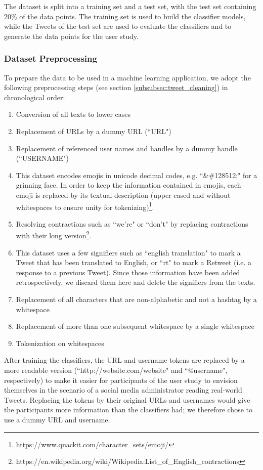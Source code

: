 The dataset is split into a training set and a test set, with the test set containing 20\% of the data points. The training set is used to build the classifier models, while the Tweets of the test set are used to evaluate the classifiers and to generate the data points for the user study.



\subsubsection{Dataset Preprocessing}
To prepare the data to be used in a machine learning application, we adopt the following preprocessing steps (see section \ref{subsubsec:tweet_cleaning}) in chronological order:
\begin{enumerate}
	\item Conversion of all texts to lower cases
	\item Replacement of URLs by a dummy URL (``URL")
	\item Replacement of referenced user names and handles by a dummy handle (``USERNAME")
	\item This dataset encodes emojis in unicode decimal codes, e.g. ``\&\#128512;" for a grinning face. In order to keep the information contained in emojis, each emoji is replaced by its textual description (upper cased and without whitespaces to ensure unity for tokenizing)\footnote{https://www.quackit.com/character\_sets/emoji/}.
	\item Resolving contractions such as ``we're" or ``don't" by replacing contractions with their long version\footnote{https://en.wikipedia.org/wiki/Wikipedia:List\_of\_English\_contractions}.
	\item This dataset uses a few signifiers such as ``english translation" to mark a Tweet that has been translated to English, or ``rt" to mark a Retweet (i.e. a response to a previous Tweet). Since those information have been added retrospectively, we discard them here and delete the signifiers from the texts.
	\item Replacement of all characters that are non-alphabetic and not a hashtag by a whitespace
	\item Replacement of more than one subsequent whitespace by a single whitespace
	\item Tokenization on whitespaces
\end{enumerate}
After training the classifiers, the URL and username tokens are replaced by a more readable version (``http://website.com/website" and ``@username", respectively) to make it easier for participants of the user study to envision themselves in the scenario of a social media administrator reading real-world Tweets. Replacing the tokens by their original URLs and usernames would give the participants more information than the classifiers had; we therefore chose to use a dummy URL and username.\newline
